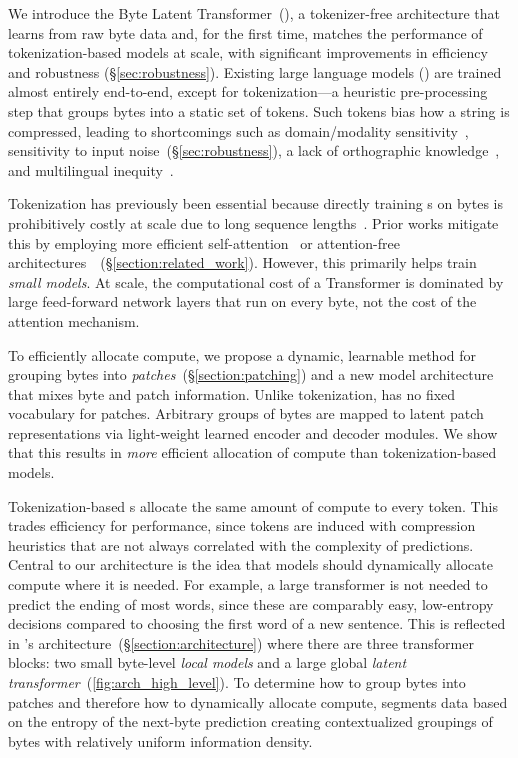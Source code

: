 \documentclass[]{fairmeta}
\begin{document}
We introduce the Byte Latent Transformer~(\modelbf{}), a tokenizer-free architecture that learns from raw byte data and, for the first time, matches the performance of tokenization-based models at scale, with significant improvements in efficiency and robustness (\S\ref{sec:robustness}).
Existing large language models (\llms{}) are trained almost entirely end-to-end, except for tokenization---a heuristic pre-processing step that groups bytes into a static set of tokens.
Such tokens bias how a string is compressed, leading to shortcomings such as domain/modality sensitivity~\citep{dagangetting}, sensitivity to input noise~(\S\ref{sec:robustness}), a lack of orthographic knowledge~\citep{edman2024cute}, and multilingual inequity~\citep{liang2023xlm,petrov2024language,limisiewicz2024myte}. 

Tokenization has previously been essential because directly training \llm{}s on bytes is prohibitively costly at scale due to long sequence lengths~\citep{xue2022byt5}.
Prior works mitigate this by employing more efficient self-attention~\citep{el2020characterbert, clark2022canine} or attention-free architectures~\citep{wang2024mambabyte}~(\S\ref{section:related_work}). However, this primarily helps train \textit{small models}.
At scale, the computational cost of a Transformer is dominated by large feed-forward network layers that run on every byte, not the cost of the attention mechanism.


To efficiently allocate compute, we propose a dynamic, learnable method for grouping bytes into \textit{patches}~(\S\ref{section:patching}) and a new model architecture that mixes byte and patch information.
Unlike tokenization, \model{} has no fixed vocabulary for patches.
Arbitrary groups of bytes are mapped to latent patch representations via light-weight learned encoder and decoder modules.
We show that this results in \textit{more} efficient allocation of compute than tokenization-based models.

Tokenization-based \llm{}s allocate the same amount of compute to every token. This trades efficiency for performance, since tokens are induced with compression heuristics that are not always correlated with the complexity of predictions. Central to our architecture is the idea that models should dynamically allocate compute where it is needed. For example, a large transformer is not needed to predict the ending of most words, since these are comparably easy, low-entropy decisions compared to choosing the first word of a new sentence.
This is reflected in \model{}'s architecture~(\S\ref{section:architecture}) where there are three transformer blocks: two small byte-level \textit{local models} and a large global \textit{latent transformer}~(\autoref{fig:arch_high_level}).
To determine how to group bytes into patches and therefore how to dynamically allocate compute, \model{}
segments data based on the entropy of the next-byte prediction creating contextualized groupings of bytes with relatively uniform information density.
\end{document}
